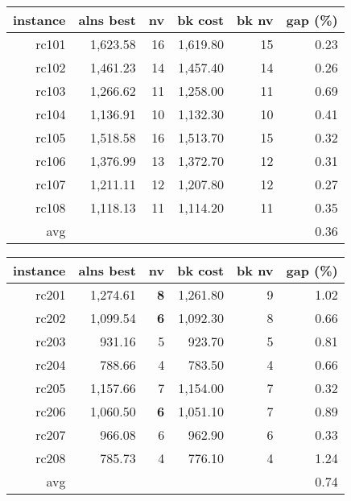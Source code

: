   \begin{table}[caption={Kết quả đo với tập Solomon RC1}, label=exp:solomonRC1]
    \centering
    \begin{tabular}{rrrrrr}
    \hline
    instance & alns best & nv & bk cost & bk nv & gap (\%) \\ \hline
    rc101 & 1,623.58 & 16 & 1,619.80 & 15 & 0.23 \\ \hline
    rc102 & 1,461.23 & 14 & 1,457.40 & 14 & 0.26 \\ \hline
    rc103 & 1,266.62 & 11 & 1,258.00 & 11 & 0.69 \\ \hline
    rc104 & 1,136.91 & 10 & 1,132.30 & 10 & 0.41 \\ \hline
    rc105 & 1,518.58 & 16 & 1,513.70 & 15 & 0.32 \\ \hline
    rc106 & 1,376.99 & 13 & 1,372.70 & 12 & 0.31 \\ \hline
    rc107 & 1,211.11 & 12 & 1,207.80 & 12 & 0.27 \\ \hline
    rc108 & 1,118.13 & 11 & 1,114.20 & 11 & 0.35 \\ \hline
    avg &  &  &  &  & 0.36 \\ \hline
    \end{tabular}
  \end{table}

  \begin{table}[caption={Kết quả đo với tập Solomon RC2}, label=exp:solomonRC2]
    \centering
    \begin{tabular}{rrrrrr}
    \hline
    instance & alns best & nv & bk cost & bk nv & gap (\%) \\ \hline
    rc201 & 1,274.61 & \textbf{8} & 1,261.80 & 9 & 1.02 \\ \hline
    rc202 & 1,099.54 & \textbf{6} & 1,092.30 & 8 & 0.66 \\ \hline
    rc203 & 931.16 & 5 & 923.70 & 5 & 0.81 \\ \hline
    rc204 & 788.66 & 4 & 783.50 & 4 & 0.66 \\ \hline
    rc205 & 1,157.66 & 7 & 1,154.00 & 7 & 0.32 \\ \hline
    rc206 & 1,060.50 & \textbf{6} & 1,051.10 & 7 & 0.89 \\ \hline
    rc207 & 966.08 & 6 & 962.90 & 6 & 0.33 \\ \hline
    rc208 & 785.73 & 4 & 776.10 & 4 & 1.24 \\ \hline
    avg &  &  &  &  & 0.74 \\ \hline
    \end{tabular}
  \end{table}

